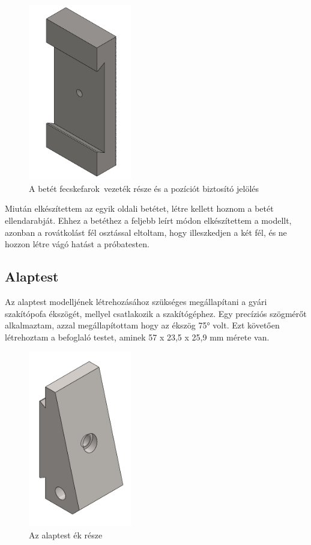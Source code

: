 \documentclass[12pt,a4paper,oneside]{report}
\begin{document}
\begin{figure}[H]
\centering
\includegraphics[width=4.5cm]{figures/betet_pozicio}
\caption{A betét \glqq fecskefarok\grqq\ vezeték része és a pozíciót biztosító jelölés}
\label{Fig:betet_pozicio}
\end{figure}

Miután elkészítettem az egyik oldali betétet, létre kellett hoznom a betét ellendarabját. Ehhez a betéthez a feljebb leírt módon elkészítettem a modellt, azonban a rovátkolást fél osztással eltoltam, hogy illeszkedjen a két fél, és ne  hozzon létre vágó hatást a próbatesten.

\subsection{Alaptest}
Az alaptest modelljének létrehozásához szükséges megállapítani a gyári szakítópofa ékszögét, mellyel csatlakozik a szakítógéphez. Egy precíziós szögmérőt alkalmaztam, azzal megállapítottam hogy az ékszög 75° volt. Ezt követően létrehoztam a befoglaló testet, aminek 57 x 23,5 x 25,9 mm mérete van.

\begin{figure}[H]
\centering
\includegraphics[width=4.5cm]{figures/alaptest_ek}
\caption{Az alaptest ék része}
\label{Fig:alaptest_ek}
\end{figure}
\end{document}
